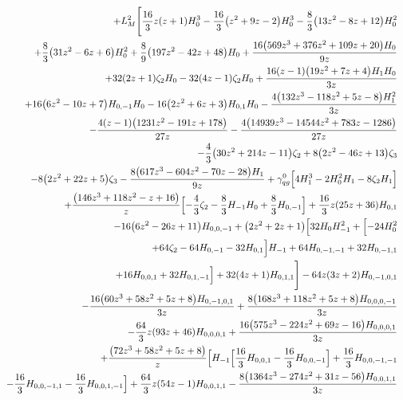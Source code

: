 \begin{eqnarray}
\nonumber \\ &&
+L_M^2 
\Biggl[\frac{16}{3}  z (z+1)H_0^3-\frac{16}{3} \big(z^2+9 z-2\big) H_0^3-\frac{8}{3} \big(13 z^2-8z+12\big) H_0^2
\nonumber \\ &&
+\frac{8}{3}  \big(31 z^2-6 z+6\big) H_0^2+\frac{8}{9} \big(197 z^2-42 z+48\big) H_0+\frac{16 \big(569 z^3+376 z^2+109  z+20\big) H_0}{9 z}
\nonumber \\ &&
+32 (2 z+1) \zeta_2 H_0-32  (4 z-1) \zeta_2 H_0+\frac{16 (z-1) \big(19 z^2+7 z+4\big) H_1 H_0}{3 z}
\nonumber \\ &&
+16  \big(6z^2-10 z+7\big) H_{0,-1} H_0-16 \big(2 z^2+6 z+3\big) H_{0,1} H_0-\frac{4  \big(132 z^3-118 z^2+5 z-8\big) H_1^2}{3 z}
\nonumber \\ &&
-\frac{4  (z-1) \big(1231  z^2-191 z+178\big)}{27 z}-\frac{4 \big(14939 z^3-14544 z^2+783  z-1286\big)}{27 z}
\nonumber \\ &&
-\frac{4}{3} \big(30 z^2+214 z-11\big) \zeta_2+8 \big(2 z^2-46 z+13\big) \zeta_3
\nonumber \\ &&
-8 \big(2 z^2+22 z+5\big)\zeta_3-\frac{8 \big(617 z^3-604 z^2-70 z-28\big) H_1}{9  z}+{\gamma}_{qg}^{0} \Bigl[4 H_1^3-2 H_0^2 H_1-8 \zeta_2H_1\Bigr]
\nonumber \\ &&
+\frac{\big(146 z^3+118 z^2-z+16\big) }{z}\Bigl[-\frac{4}{3}   \zeta_2-\frac{8}{3}  H_{-1} H_0+\frac{8}{3}   H_{0,-1}\Bigr]
+\frac{16}{3} z (25 z+36) H_{0,1}
\nonumber \\ &&
-16  \big(6 z^2-26z+11\big) H_{0,0,-1}+\big(2 z^2+2 z+1\big) \Bigl[32  H_0H_{-1}^2+\Bigl[-24  H_0^2
\nonumber \\ &&
+64  \zeta_2-64  H_{0,-1}-32 H_{0,1}\Bigr] H_{-1}+64  H_{0,-1,-1}+32  H_{0,-1,1}
\nonumber \\ &&
+16H_{0,0,1}+32  H_{0,1,-1}\Bigr]+32 (4 z+1) H_{0,1,1}\Biggr]
-64  z (3z+2) H_{0,-1,0,1}
\nonumber \\ &&
-\frac{16 \big(60 z^3+58 z^2+5 z+8\big) H_{0,-1,0,1}}{3  z}+\frac{8 \big(168 z^3+118 z^2+5 z+8\big) H_{0,0,0,-1}}{3 z}
\nonumber \\ &&
-\frac{64}{3} z (93 z+46) H_{0,0,0,1}+\frac{16 \big(575 z^3-224 z^2+69 z-16\big)  H_{0,0,0,1}}{3 z}
\nonumber \\ &&
+\frac{\big(72 z^3+58 z^2+5 z+8\big) }{z}\Bigl[H_{-1}  
\Bigl[\frac{16}{3} H_{0,0,1}-\frac{16}{3} H_{0,0,-1}\Bigr]+\frac{16}{3}  H_{0,0,-1,-1}
\nonumber \\ &&
-\frac{16}{3} H_{0,0,-1,1}-\frac{16}{3}  H_{0,0,1,-1}\Bigr]
+\frac{64}{3}  z (54 z-1) H_{0,0,1,1}-\frac{8  \big(1364 z^3-274 z^2+31 z-56\big) H_{0,0,1,1}}{3 z}

\end{eqnarray}
